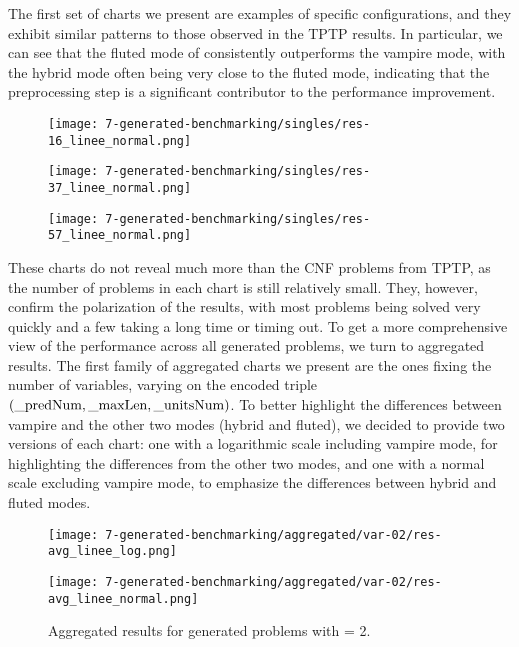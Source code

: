 The first set of charts we present are examples of specific configurations, and they exhibit similar patterns to those observed in the TPTP results.
In particular, we can see that the fluted mode of consistently outperforms the vampire mode, with the hybrid mode often being very close to the fluted mode, indicating that the preprocessing step is a significant contributor to the performance improvement.

\begin{figure}[H]
  \centering
  \texttt{[image: 7-generated-benchmarking/singles/res-16\_linee\_normal.png]}
\end{figure}
\begin{figure}[H]
    \centering
    \texttt{[image: 7-generated-benchmarking/singles/res-37\_linee\_normal.png]}
\end{figure}
\begin{figure}[H]
    \centering
    \texttt{[image: 7-generated-benchmarking/singles/res-57\_linee\_normal.png]}
\end{figure}

These charts do not reveal much more than the CNF problems from TPTP, as the number of problems in each chart is still relatively small.
They, however, confirm the polarization of the results, with most problems being solved very quickly and a few taking a long time or timing out.
To get a more comprehensive view of the performance across all generated problems, we turn to aggregated results.
The first family of aggregated charts we present are the ones fixing the number of variables, varying on the encoded triple \((\text{\code{_predNum}}, \text{\code{_maxLen}}, \text{\code{_unitsNum}})\).
To better highlight the differences between vampire and the other two modes (hybrid and fluted), we decided to provide two versions of each chart: one with a logarithmic scale including vampire mode, for highlighting the differences from the other two modes, and one with a normal scale excluding vampire mode, to emphasize the differences between hybrid and fluted modes.
\begin{figure}[H]
  \centering
  \begin{minipage}{1\textwidth}
    \centering
    \texttt{[image: 7-generated-benchmarking/aggregated/var-02/res-avg\_linee\_log.png]}
  \end{minipage}
  \hfill
  \begin{minipage}{1\textwidth}
    \centering
    \texttt{[image: 7-generated-benchmarking/aggregated/var-02/res-avg\_linee\_normal.png]}
  \end{minipage}
  \caption{Aggregated results for generated problems with  = 2.}\label{fig:agg-var2}
\end{figure}

